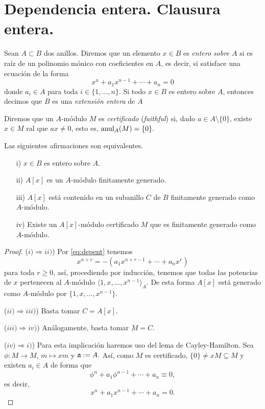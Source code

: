 \documentclass[../main.tex]{subfiles}
\begin{document}
	\section{Dependencia entera. Clausura entera.}
	\begin{definition}
		Sean $A\subset B$ dos anillos. Diremos que un elemento $x\in B$ es \textit{entero sobre $A$} si es raíz de un polinomio mónico con coeficientes en $A$, es decir, si satisface una ecuación de la forma
		\begin{equation}\label{eq:depent}
		x^n+a_1x^{n-1}+\cdots+a_n=0
		\end{equation}
		donde $a_i\in A$ para toda $i\in\{1,\dots,n\}.$ Si todo $x\in B$ es entero sobre $A$, entonces decimos que $B$ es una \textit{extensión entera} de $A$
	\end{definition}
	
	\begin{definition}Diremos que un $A$-módulo $M$ es \textit{certificado} (\textit{faithful}) si, dado $a\in A\setminus\{0\}$, existe $x\in M$ ral que $ax\neq 0$, esto es, $\operatorname{anul}_A(M)=\{0\}.$
	\end{definition}
	
	\begin{proposition}\label{prop:entcarac}Las siguientes afirmaciones son equivalentes.
		\begin{itemize}
			\item[i)] $x\in B$ es entero sobre $A.$
			\item[ii)] $A[x]$ es un $A$-módulo finitamente generado.
			\item[iii)] $A[x]$ está contenido en un subanillo $C$ de $B$ finitamente generado como $A$-módulo.
			\item[iv)] Existe un $A[x]$-módulo certificado $M$ que es finitamente generado como $A$-módulo.
		\end{itemize}
	\end{proposition}
	\begin{proof}
		($i)\Rightarrow ii)$) Por \ref{eq:depent} tenemos
		$$x^{n+r}=-(a_1x^{n+r-1}+\cdots+a_nx^r)$$
		para toda $r\ge 0$, así, procediendo por inducción, tenemos que todas las potencias de $x$ pertenecen al $A$-módulo $\langle 1,x,\dots,x^{n-1}\rangle_A.$ De esta forma $A[x]$ está generado como $A$-módulo por $\{1,x,\dots,x^{n-1}\}.$
		
		($ii)\Rightarrow iii)$) Basta tomar $C=A[x].$
		
		($iii)\Rightarrow iv)$) Análogamente, basta tomar $M=C.$
		
		($iv)\Rightarrow i)$) Para esta implicación haremos uso del lema de Cayley-Hamilton. Sea $\phi:M\rightarrow M$, $m\mapsto xm$ y $\mathfrak{a}:= A.$ Así, como $M$ es certificado, $\{0\}\neq xM\subseteq M$ y existen $a_i\in A$ de forma que
		$$\phi^n+a_1\phi^{n-1}+\cdots+a_n\equiv 0,$$
		es decir,
		$$x^n+a_1x^{n-1}+\cdots+a_n= 0.$$
	\end{proof}
	
\end{document}
